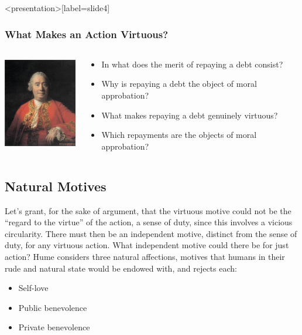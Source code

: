 \begin{frame}<presentation>[label=slide4]
    \frametitle{What Makes an Action Virtuous?}
        \begin{columns}
            \begin{column}{3cm}
                \includegraphics[height=4cm]{../../../graphics/hume.jpg}
            \end{column}
            \begin{column}{7cm}
                \begin{itemize}
                    \item<2-> In what does the merit of repaying a debt consist? 
                    \item<2-> Why is repaying a debt the object of moral approbation?
                    \item<3-> What makes repaying a debt genuinely virtuous? 
                    \item<3-> Which repayments are the objects of moral approbation?
                \end{itemize}
            \end{column}
        \end{columns}
\end{frame}


\subsection{Natural Motives}\label{sec:natural_motives} %

Let’s grant, for the sake of argument, that the virtuous motive could not be the ``regard to the virtue'' of the action, a sense of duty, since this involves a vicious circularity. There must then be an independent motive, distinct from the sense of duty, for any virtuous action. What independent motive could there be for just action? Hume considers three natural affections, motives that humans in their rude and natural state would be endowed with, and rejects each:
\begin{itemize}
    \item Self-love
    \item Public benevolence
    \item Private benevolence
\end{itemize}

